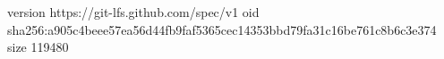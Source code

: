 version https://git-lfs.github.com/spec/v1
oid sha256:a905c4beee57ea56d44fb9faf5365cec14353bbd79fa31c16be761c8b6c3e374
size 119480
